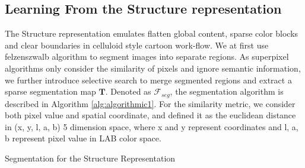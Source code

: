 \documentclass[10pt,twocolumn,letterpaper]{article}
\begin{document}
\vspace{-0.3em}
\subsection{Learning From the Structure representation}
\vspace{-0.3em}
The Structure representation emulates flatten global content, sparse color blocks and clear boundaries in celluloid style cartoon work-flow. We at first use felzenszwalb algorithm to segment images into separate regions. As superpixel algorithms only consider the similarity of pixels and ignore semantic information, we further introduce selective search \cite{uijlings2013selective} to merge segmented regions and extract a sparse segmentation map $\bm{T}$. Denoted as $\mathcal{F}_{seg}$, the segmentation algorithm is described in Algorithm \ref{alg:algorithmic1}. For the similarity metric, we consider both pixel value and spatial coordinate, and defined it as the euclidean distance in (x, y, l, a, b) 5 dimension space, where x and y represent coordinates and l, a, b represent pixel value in LAB color space.

\vspace{-0.5em}
\begin{algorithm}
     \caption{Segmentation for the Structure Representation}
    \label{alg:algorithmic1}
\end{algorithm}
\vspace{-0.5em}
\end{document}

